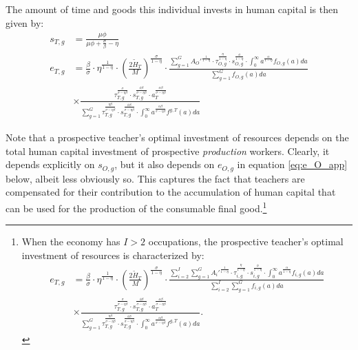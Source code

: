 \documentclass[onehalfspacing,11pt]{article}
\begin{document}
	The amount of time and goods this individual invests in human capital is then given by:
	\begin{align}
		\label{app_eq:s_T}
		s_{T,g} & = \frac{\mu \phi}{\mu \phi+\tfrac{\sigma}{\beta}-\eta} \\
		\label{app_eq:e_T}
		e_{T,g} & = \tfrac{\beta}{\sigma}\cdot\eta^{\frac{1}{1-\eta}}\cdot \left(\tfrac{2\widetilde{H}_T}{M}\right)^{\frac{\sigma}{1-\eta}} \cdot \frac{\sum_{g=1}^G {A_O'}^\frac{1}{1-\eta}\cdot\tau_{O,g}^\frac{\eta}{1-\eta} \cdot s_{O,g}^\frac{\phi}{1-\eta}\cdot \int_0^\infty a^{\frac{\alpha}{1-\eta}} f_{O,g}(a)da}{\sum_{g=1}^G f_{O,g}(a)da} \nonumber\\
		& \times \frac{\tau_{T,g}^\frac{\sigma}{\sigma-\eta\beta } \cdot s_{T,g}^\frac{\phi\beta }{\sigma-\eta\beta } \cdot a_T^\frac{\alpha\beta }{\sigma-\eta\beta}}{\sum_{g=1}^G \tau_{T,g}^\frac{\eta\beta }{\sigma-\eta\beta } \cdot s_{T,g}^\frac{\phi\beta }{\sigma-\eta\beta } \cdot \int_0^\infty a^\frac{\alpha\beta}{\sigma-\eta\beta } f^{g,T}(a)da}
	\end{align}
	
	Note that a prospective teacher's optimal investment of resources depends on the total human capital investment of prospective {\it production} workers. Clearly, it depends explicitly on $s_{O,g}$, but it also depends on $e_{O,g}$ in equation \eqref{eq:e_O_app} below, albeit less obviously so. This captures the fact that teachers are compensated for their contribution to the accumulation of human capital that can be used for the production of the consumable final good.\footnote{When the economy has $I>2$ occupations, the prospective teacher's optimal investment of resources is characterized by:
		\begin{align*}
			e_{T,g} & = \tfrac{\beta}{\sigma}\cdot\eta^{\frac{1}{1-\eta}}\cdot \left(\tfrac{2\widetilde{H}_T}{M}\right)^{\frac{\sigma}{1-\eta}} \cdot \frac{\sum_{i=2}^I \sum_{g=1}^G {A_i'}^\frac{1}{1-\eta}\cdot\tau_{i,g}^\frac{\eta}{1-\eta} \cdot s_{i,g}^\frac{\phi}{1-\eta}\cdot \int_0^\infty a^{\frac{\alpha}{1-\eta}} f_{i,g}(a)da}{\sum_{i=2}^I \sum_{g=1}^G f_{i,g}(a)da} \nonumber\\
			& \times \frac{\tau_{T,g}^\frac{\sigma}{\sigma-\eta\beta } \cdot s_{T,g}^\frac{\phi\beta }{\sigma-\eta\beta } \cdot a_T^\frac{\alpha\beta }{\sigma-\eta\beta }}{\sum_{g=1}^G \tau_{T,g}^\frac{\eta\beta }{\sigma-\eta\beta } \cdot s_{T,g}^\frac{\phi\beta }{\sigma-\eta\beta } \cdot \int_0^\infty a^\frac{\alpha\beta}{\sigma-\eta\beta } f^{g,T}(a)da}.
		\end{align*}
	}
	
\end{document}
